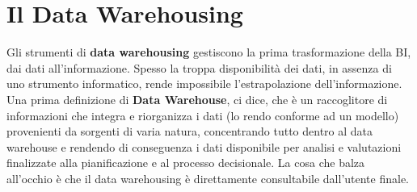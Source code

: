 \section{Il Data Warehousing}
Gli strumenti di \textbf{data warehousing} gestiscono la prima trasformazione della BI, dai dati all’informazione. Spesso la troppa disponibilità dei dati, in assenza di uno strumento informatico, rende impossibile l’estrapolazione dell’informazione. 
Una prima definizione di \textbf{Data Warehouse}, ci dice, che è un raccoglitore di informazioni che integra e riorganizza i dati (lo rendo conforme ad un modello) provenienti da sorgenti di varia natura, concentrando tutto dentro al data warehouse e  rendendo di conseguenza i dati disponibile per analisi e valutazioni finalizzate alla pianificazione e al processo decisionale. La cosa che balza all’occhio è che il data warehousing è direttamente consultabile dall’utente finale.

